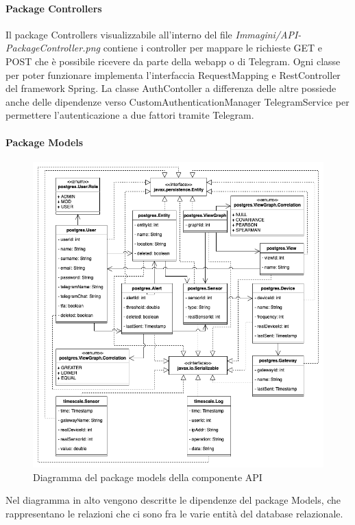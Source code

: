 		\paragraph{Package Controllers}
		Il package Controllers visualizzabile all'interno del file \textit{Immagini/API-PackageController.png} contiene i controller per mappare le richieste GET e POST che è possibile ricevere da parte della webapp o di Telegram. Ogni classe per poter funzionare implementa l'interfaccia RequestMapping e RestController del framework Spring. La classe AuthContoller a differenza delle altre possiede anche delle dipendenze verso CustomAuthenticationManager TelegramService per permettere l'autenticazione a due fattori tramite Telegram.
		\paragraph*{Package Models}
		\begin{figure}[H]
			\centering
			\includegraphics[scale=0.550]{res/images/API/ModelsPackage.png}
			\caption{Diagramma del package models della componente API}
			\label{Diagramma 14}
		\end{figure}
		Nel diagramma in alto vengono descritte le dipendenze del package Models, che rappresentano le relazioni che ci sono fra le varie entità del database relazionale. 
